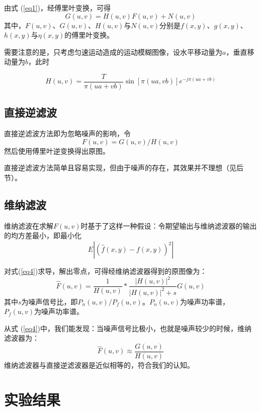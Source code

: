 \documentclass[11pt, a4paper]{article}
\begin{document}
由式 (\ref{eq1})，经傅里叶变换，可得
\begin{equation}\label{eq2}
  G(u, v) = H(u, v) F(u, v) + N(u, v)
\end{equation}
其中，$F(u,v)$、$G(u,v)$、$H(u,v)$与$N(u,v)$分别是$f(x,y)$、$g(x,y)$、$h(x,y)$与$\eta(x,y)$的傅里叶变换。

需要注意的是，只考虑匀速运动造成的运动模糊图像，设水平移动量为$a$，垂直移动量为$b$，此时

\begin{equation}
  H(u,v) = \frac{T}{\pi(ua+vb)}\sin{[\pi(ua,vb)]}e^{-j\pi(ua+vb)}
\end{equation}

\subsection{直接逆滤波}

直接逆滤波方法即为忽略噪声的影响，令
\begin{equation}\label{eq3}
  F(u,v)=G(u,v)/H(u,v)
\end{equation}
然后使用傅里叶逆变换得出原图。

直接逆滤波方法简单且容易实现，但由于噪声的存在，其效果并不理想（见后节）。

\subsection{维纳滤波}

维纳滤波在求解$F(u,v)$时基于了这样一种假设：令期望输出与维纳滤波器的输出的均方差最小，即最小化
\begin{equation}\label{eq4}
  E|{(\hat{f}(x,y)-f(x,y))}^2|
\end{equation}

对式(\ref{eq4})求导，解出零点，可得经维纳滤波器得到的原图像为：
\begin{equation}\label{eq5}
  \hat{F}(u,v)=\frac{1}{H(u,v)}*\frac{{|H(u,v)|}^2}{{|H(u,v)|}^2+s}G(u,v)
\end{equation}
其中$s$为噪声信号比，即$P_n(u,v)/P_f(u,v)$。$P_n(u,v)$为噪声功率谱，$P_f(u,v)$为噪声功率谱。

从式 (\ref{eq4})中，我们能发现：当噪声信号比极小，也就是噪声较少的时候，维纳滤波器为：
\begin{equation}\label{eq6}
  \hat{F}(u,v)\approx\frac{G(u,v)}{H(u,v)}
\end{equation}
维纳滤波器与直接逆滤波器是近似相等的，符合我们的认知。

\section{实验结果}
\end{document}
